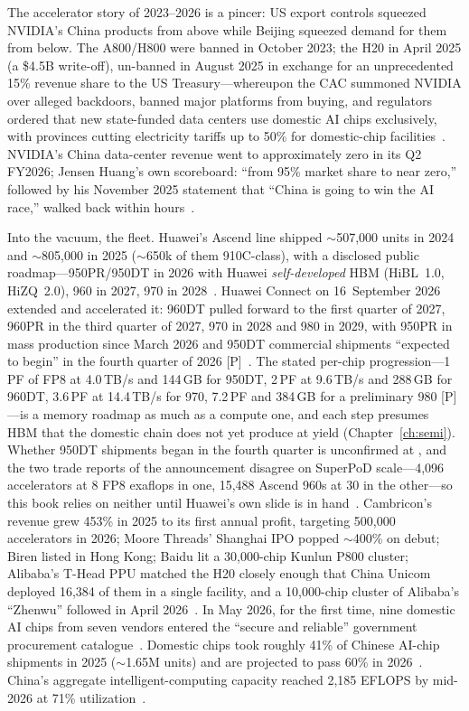 The accelerator story of 2023--2026 is a pincer: US export controls squeezed NVIDIA's China products from above while Beijing squeezed demand for them from below. The A800/H800 were banned in October 2023; the H20 in April 2025 (a \$4.5B write-off), un-banned in August 2025 in exchange for an unprecedented 15\% revenue share to the US Treasury---whereupon the CAC summoned NVIDIA over alleged backdoors, banned major platforms from buying, and regulators ordered that new state-funded data centers use domestic AI chips exclusively, with provinces cutting electricity tariffs up to 50\% for domestic-chip facilities~\cite{nvidia-timeline,cac-ban,datacenter-mandate}. NVIDIA's China data-center revenue went to approximately zero in its Q2 FY2026; Jensen Huang's own scoreboard: ``from 95\% market share to near zero,'' followed by his November 2025 statement that ``China is going to win the AI race,'' walked back within hours~\cite{nvidia-zero,huang-quotes}.

Into the vacuum, the fleet. Huawei's Ascend line shipped $\sim$507,000 units in 2024 and $\sim$805,000 in 2025 ($\sim$650k of them 910C-class), with a disclosed public roadmap---950PR/950DT in 2026 with Huawei \emph{self-developed} HBM (HiBL~1.0, HiZQ~2.0), 960 in 2027, 970 in 2028~\cite{semianalysis-ascend,huawei-roadmap}. Huawei Connect on 16~September 2026 extended and accelerated it: 960DT pulled forward to the first quarter of 2027, 960PR in the third quarter of 2027, 970 in 2028 and 980 in 2029, with 950PR in mass production since March 2026 and 950DT commercial shipments ``expected to begin'' in the fourth quarter of 2026 [P]~\cite{hw-huawei-connect-2026}. The stated per-chip progression---1\,PF of FP8 at 4.0\,TB/s and 144\,GB for 950DT, 2\,PF at 9.6\,TB/s and 288\,GB for 960DT, 3.6\,PF at 14.4\,TB/s for 970, 7.2\,PF and 384\,GB for a preliminary 980 [P]---is a memory roadmap as much as a compute one, and each step presumes HBM that the domestic chain does not yet produce at yield (Chapter~\ref{ch:semi}). Whether 950DT shipments began in the fourth quarter is unconfirmed at \datafreeze, and the two trade reports of the announcement disagree on SuperPoD scale---4,096 accelerators at 8 FP8 exaflops in one, 15,488 Ascend 960s at 30 in the other---so this book relies on neither until Huawei's own slide is in hand~\cite{hw-huawei-connect-2026}. Cambricon's revenue grew 453\% in 2025 to its first annual profit, targeting 500,000 accelerators in 2026; Moore Threads' Shanghai IPO popped $\sim$400\% on debut; Biren listed in Hong Kong; Baidu lit a 30,000-chip Kunlun P800 cluster; Alibaba's T-Head PPU matched the H20 closely enough that China Unicom deployed 16,384 of them in a single facility, and a 10,000-chip cluster of Alibaba's ``Zhenwu'' followed in April 2026~\cite{cambricon,ipos-chips,kunlun,ppu}. In May 2026, for the first time, nine domestic AI chips from seven vendors entered the ``secure and reliable'' government procurement catalogue~\cite{anke}. Domestic chips took roughly 41\% of Chinese AI-chip shipments in 2025 ($\sim$1.65M units) and are projected to pass 60\% in 2026~\cite{domestic-share}. China's aggregate intelligent-computing capacity reached 2,185 EFLOPS by mid-2026 at 71\% utilization~\cite{miit-eflops}.

